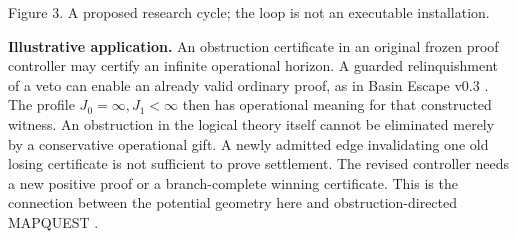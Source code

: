 \documentclass[11pt]{article}
\theoremstyle{remark}\newtheorem{remark}[theorem]{Remark}
\begin{document}
\begin{center}

\small Figure 3. A proposed research cycle; the loop is not an executable installation.
\end{center}
\noindent\textbf{Illustrative application.} An obstruction certificate in an original frozen proof controller may certify an infinite operational horizon. A guarded relinquishment of a veto can enable an already valid ordinary proof, as in Basin Escape v0.3 \cite{basin}. The profile $J_0=\infty,J_1<\infty$ then has operational meaning for that constructed witness. An obstruction in the logical theory itself cannot be eliminated merely by a conservative operational gift. A newly admitted edge invalidating one old losing certificate is not sufficient to prove settlement. The revised controller needs a new positive proof or a branch-complete winning certificate. This is the connection between the potential geometry here and obstruction-directed MAPQUEST \cite{obstruction}.
\end{document}
